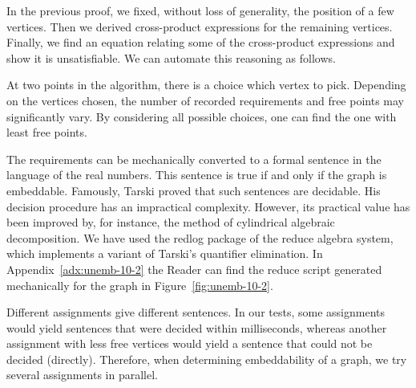 \documentclass[adraft,copyright,creativecommons]{eptcs}
\newcounter{main}
\theoremstyle{definition}
\theoremstyle{remark}
\begin{document}
In the previous proof, we fixed, without loss of generality, the position
of a few vertices.  Then we derived cross-product expressions for the
remaining vertices.  Finally, we find an equation relating some of
the cross-product expressions and show it is unsatisfiable.
We can automate this reasoning as follows.

\begin{algorithm}
\end{algorithm}
At two points in the algorithm, there is a choice which vertex to pick.
Depending on the vertices chosen, the number of recorded requirements
and free points may significantly vary. By considering all possible choices,
one can find the one with least free points.

The requirements can be mechanically converted
to a formal sentence
in the language of the real numbers.
This sentence is true if and only if the graph is embeddable.
Famously, Tarski proved\cite{tarski}
that such sentences are decidable.
His decision procedure has an impractical complexity.
However, its practical value has been improved
by, for instance, the method of cylindrical algebraic decomposition\cite{qecad}.
We have used the redlog\cite{redlog} package of the reduce algebra
system, which implements a variant of Tarski's quantifier elimination.
In Appendix~\ref{adx:unemb-10-2} the Reader can find
the reduce script generated mechanically for the graph
in Figure~\ref{fig:unemb-10-2}.

Different assignments give different sentences.  In our tests,
some assignments would yield sentences that were decided within milliseconds,
whereas another assignment with less free vertices would
yield a sentence that could not be decided (directly).
Therefore, when determining embeddability of a graph,
we try several assignments in parallel.
\end{document}
